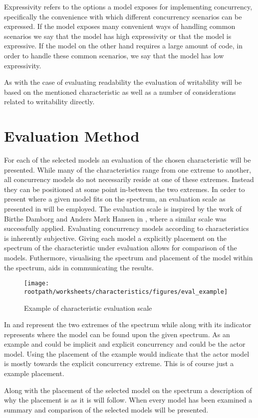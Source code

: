 Expressivity refers to the options a model exposes for implementing concurrency, specifically the convenience with which different concurrency scenarios can be expressed. If the model exposes many convenient ways of handling common scenarios we say that the model has high expressivity or that the model is expressive. If the model on the other hand requires a large amount of code, in order to handle these common scenarios, we say that the model has low expressivity.

As with the case of evaluating readability the evaluation of writability will be based on the mentioned characteristic as well as a number of considerations related to writability directly.

\section{Evaluation Method}
For each of the selected models an evaluation of the chosen characteristic will be presented. While many of the characteristics range from one extreme to another, all concurrency models do not necessarily reside at one of these extremes. Instead they can be positioned at some point in-between the two extremes. In order to present where a given model fits on the spectrum, an evaluation scale as presented in  will be employed. The evaluation scale is inspired by the work of Birthe Damborg and Anders Mørk Hansen in \cite{StudyInConcurrency}, where a similar scale was successfully applied. Evaluating concurrency models according to characteristics is inherently subjective. Giving each model a explicitly placement on the spectrum of the characteristic under evaluation allows for comparison of the models. Futhermore, visualising the spectrum and placement of the model within the spectrum, aids in communicating the results.

\begin{figure}[ht!]
\centering
\texttt{[image: \\rootpath/worksheets/characteristics/figures/eval\_example]}
\caption{Example of characteristic evaluation scale}\label{fig:char_evel_example}
\end{figure}

In   and  represent the two extremes of the spectrum while  along with its indicator represents where the model  can be found upon the given spectrum. As an example  and  could be implicit and explicit concurrency and  could be the actor model. Using the placement of the example  would indicate that the actor model is mostly towards the explicit concurrency extreme. This is of course just a example placement.

Along with the placement of the selected model on the spectrum a description of why the placement is as it is will follow. When every model has been examined a summary and comparison of the selected models will be presented.
\worksheetend
